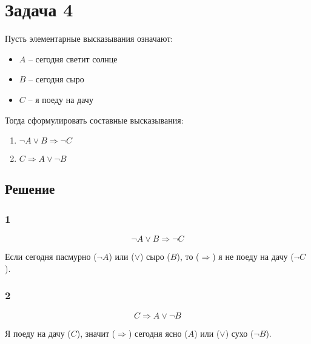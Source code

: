\section*{Задача 4}

Пусть элементарные высказывания означают:
\begin{itemize}
  \item \(A\) -- сегодня светит солнце
  \item \(B\) -- сегодня сыро
  \item \(C\) -- я поеду на дачу
\end{itemize}

Тогда сформулировать составные высказывания:
\begin{enumerate}
  \item \(\neg A \vee B \Rightarrow \neg C\)
  \item \(C \Rightarrow A \vee \neg B\)
\end{enumerate}

\subsection*{Решение}

\subsubsection*{1}

\[\neg A \vee B \Rightarrow \neg C\]

Если сегодня пасмурно (\(\neg A\)) или (\(\vee\)) сыро (\(B\)),
то (\(\Rightarrow\)) я не поеду на дачу (\(\neg C\)).

\subsubsection*{2}

\[C \Rightarrow A \vee \neg B\]

Я поеду на дачу (\(C\)),
значит (\(\Rightarrow\)) сегодня ясно (\(A\)) или (\(\vee\)) сухо (\(\neg B\)).

